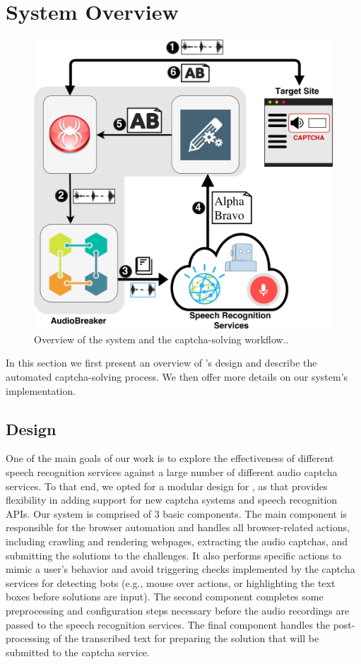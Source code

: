 \section{System Overview}
\label{sec:system}

\begin{figure}
\centering
\includegraphics[width=\columnwidth]{figures/breaker_arch.pdf}
\caption{Overview of the \system system and the captcha-solving workflow..}
\label{fig:breaker}
\end{figure}

In this section we first present an overview of \system's design and describe the automated 
captcha-solving process. We then offer more details on our system's implementation.

\subsection{\system Design}

One of the main goals of our work is to explore the effectiveness of different speech recognition
services against a large number of different audio captcha services. To that end, we opted for 
a modular design for \system, as that provides flexibility in adding support for new captcha 
systems and speech recognition APIs. Our system is comprised of 3 basic components. The main 
component is responsible for the browser automation and handles all browser-related actions,
including crawling and rendering webpages, extracting the audio captchas, and submitting the solutions
to the challenges. It also performs specific actions to mimic a user's behavior and avoid triggering  
checks implemented by the captcha services for detecting bots (e.g., mouse over actions, or highlighting the 
text boxes before solutions are input).
The second component completes some preprocessing and configuration steps 
necessary before the audio recordings are passed to the speech recognition services. The final 
component handles the post-processing of the transcribed text for preparing the solution that will
be submitted to the captcha service.

